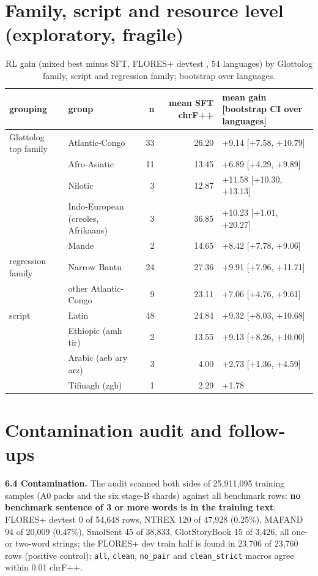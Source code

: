 \section{Family, script and resource level (exploratory, fragile)}\label{app:family}

\begin{table}[t]
\centering\scriptsize
\setlength{\tabcolsep}{4pt}
\caption{RL gain (mixed best minus SFT, FLORES+ devtest \chrfpp{}, 54 languages) by Glottolog family, script and regression family; bootstrap over languages.}\label{tab:family}
\begin{tabularx}{\linewidth}{@{}l>{\raggedright\arraybackslash}Xrr>{\raggedright\arraybackslash}X@{}}
\toprule
grouping & group & n & mean SFT chrF++ & mean gain [bootstrap CI over languages] \\
\midrule
Glottolog top family & Atlantic-Congo & 33 & 26.20 & +9.14 [+7.58, +10.79] \\
 & Afro-Asiatic & 11 & 13.45 & +6.89 [+4.29, +9.89] \\
 & Nilotic & 3 & 12.87 & +11.58 [+10.30, +13.13] \\
 & Indo-European (creoles, Afrikaans) & 3 & 36.85 & +10.23 [+1.01, +20.27] \\
 & Mande & 2 & 14.65 & +8.42 [+7.78, +9.06] \\
regression family & Narrow Bantu & 24 & 27.36 & +9.91 [+7.96, +11.71] \\
 & other Atlantic-Congo & 9 & 23.11 & +7.06 [+4.76, +9.61] \\
script & Latin & 48 & 24.84 & +9.32 [+8.03, +10.68] \\
 & Ethiopic (amh tir) & 2 & 13.55 & +9.13 [+8.26, +10.00] \\
 & Arabic (aeb ary arz) & 3 & 4.00 & +2.73 [+1.36, +4.59] \\
 & Tifinagh (zgh) & 1 & 2.29 & +1.78 \\
\bottomrule
\end{tabularx}
\end{table}



\section{Contamination audit and follow-ups}\label{app:contam}

\textbf{6.4 Contamination.} The audit scanned both sides of 25,911,095 training samples (A0 packs and the six stage-B shards) against all benchmark rows: \textbf{no benchmark sentence of 3 or more words is in the training text}; FLORES+ devtest 0 of 54,648 rows, NTREX 120 of 47,928 (0.25\%), MAFAND 94 of 20,009 (0.47\%), SmolSent 45 of 38,833, GlotStoryBook 15 of 3,426, all one- or two-word strings; the FLORES+ dev train half is found in 23,706 of 23,760 rows (positive control); \texttt{all}, \texttt{clean}, \texttt{no\_\allowbreak{}pair} and \texttt{clean\_\allowbreak{}strict} macros agree within 0.01 chrF++. 

